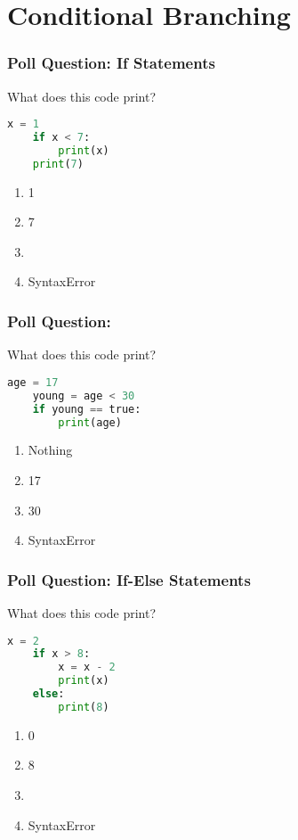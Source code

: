 \documentclass{beamer}
\begin{document}
\section{Conditional Branching}

%
%
\begin{frame}[fragile]
	\frametitle{Poll Question: If Statements}
	What does this code print?
	\begin{lstlisting}[language=Python, autogobble]
	x = 1
	if x < 7:
		print(x) 
	print(7)
	\end{lstlisting}
	\vfill
	\begin{enumerate}[A]
		\item 1
		\item 7
		\item {}
		\item SyntaxError
	\end{enumerate}
\end{frame}

%
%
\begin{frame}[fragile]
	\frametitle{Poll Question: }
	What does this code print?
	\begin{lstlisting}[language=Python, autogobble]
	age = 17
	young = age < 30
	if young == true:
		print(age)
	\end{lstlisting}
	\vfill
	\begin{enumerate}[A]
		\item Nothing
		\item 17
		\item 30
		\item SyntaxError
	\end{enumerate}
\end{frame}

%
%
\begin{frame}[fragile]
	\frametitle{Poll Question: If-Else Statements}
	What does this code print?
	\begin{lstlisting}[language=Python, autogobble]
	x = 2
	if x > 8:
		x = x - 2
		print(x)
	else:
		print(8)
	\end{lstlisting}
	\vfill
	\begin{enumerate}[A]
		\item 0
		\item 8
		\item {}
		\item SyntaxError
	\end{enumerate}
\end{frame}
\end{document}
